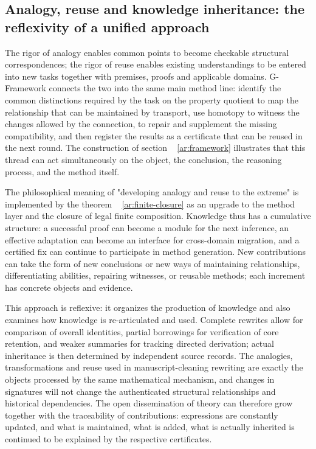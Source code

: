 \documentclass[11pt,a4paper]{article}
\theoremstyle{plain}
\theoremstyle{definition}
\theoremstyle{remark}
\begin{document}
\begin{CJK*}
\subsection { Analogy, reuse and knowledge inheritance: the reflexivity of a unified approach }\label{ar:philosophy}


The rigor of analogy enables common points to become checkable structural correspondences; the rigor of reuse enables existing understandings to be entered into new tasks together with premises, proofs and applicable domains. G-Framework connects the two into the same main method line: identify the common distinctions required by the task on the property quotient to map the relationship that can be maintained by transport, use homotopy to witness the changes allowed by the connection, to repair and supplement the missing compatibility, and then register the results as a certificate that can be reused in the next round. The construction of section ~ \ref{ar:framework} illustrates that this thread can act simultaneously on the object, the conclusion, the reasoning process, and the method itself.

The philosophical meaning of "developing analogy and reuse to the extreme" is implemented by the theorem ~ \ref{ar:finite-closure} as an upgrade to the method layer and the closure of legal finite composition. Knowledge thus has a cumulative structure: a successful proof can become a module for the next inference, an effective adaptation can become an interface for cross-domain migration, and a certified fix can continue to participate in method generation. New contributions can take the form of new conclusions or new ways of maintaining relationships, differentiating abilities, repairing witnesses, or reusable methods; each increment has concrete objects and evidence.

This approach is reflexive: it organizes the production of knowledge and also examines how knowledge is re-articulated and used. Complete rewrites allow for comparison of overall identities, partial borrowings for verification of core retention, and weaker summaries for tracking directed derivation; actual inheritance is then determined by independent source records. The analogies, transformations and reuse used in manuscript-cleaning rewriting are exactly the objects processed by the same mathematical mechanism, and changes in signatures will not change the authenticated structural relationships and historical dependencies. The open dissemination of theory can therefore grow together with the traceability of contributions: expressions are constantly updated, and what is maintained, what is added, what is actually inherited is continued to be explained by the respective certificates. \cite{S12,S20,S38}


\end{CJK*}
\end{document}
